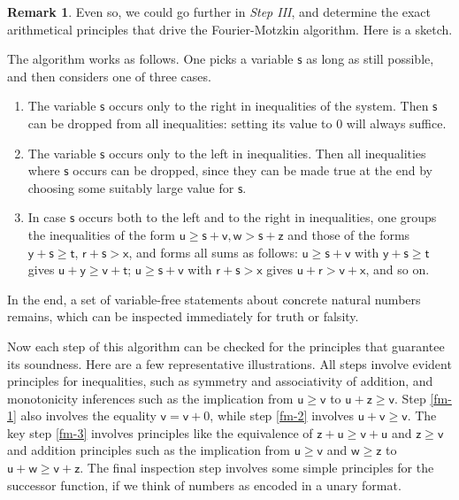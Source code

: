 \documentclass[12pt,oneside,reqno]{amsart}
\theoremstyle{definition}
\newtheorem{remark}{Remark}
\begin{document}
\begin{remark} \label{rem:fourier} Even so, we could go further in \emph{Step III}, and determine the exact arithmetical principles that drive the Fourier-Motzkin algorithm. Here is a sketch. 

The algorithm works as follows. One picks a variable $\mathsf{s}$ as long as still possible, and then considers one of three cases. \begin{enumerate}[label=(\roman*)]
\item \label{fm-1} The variable $\mathsf{s}$ occurs only to the right in inequalities of the system. Then $\mathsf{s}$ can be dropped from all inequalities: setting its value to 0 will always suffice. \item \label{fm-2} The variable $\mathsf{s}$ occurs only to the left in inequalities. Then all inequalities where $\mathsf{s}$ occurs can be dropped, since they can be made true at the end by choosing some suitably large value for $\mathsf{s}$. \item \label{fm-3} In case $\mathsf{s}$ occurs both to the left and to the right in inequalities, one groups the inequalities of the form $\mathsf{u} \geq \mathsf{s} + \mathsf{v}, \mathsf{w}> \mathsf{s} + \mathsf{z}$ and those of the forms $\mathsf{y} + \mathsf{s}\geq \mathsf{t}$, $\mathsf{r} + \mathsf{s}>\mathsf{x}$, and forms all sums as follows:
$\mathsf{u}\geq \mathsf{s} + \mathsf{v}$ with $\mathsf{y} + \mathsf{s}\geq \mathsf{t}$ gives $\mathsf{u}+\mathsf{y} \geq \mathsf{v} + \mathsf{t}$; $\mathsf{u} \geq \mathsf{s} + \mathsf{v}$ with $\mathsf{r} + \mathsf{s} > \mathsf{x}$ gives $\mathsf{u}+\mathsf{r} > \mathsf{v} + \mathsf{x}$, and so on. \end{enumerate}
In the end, a set of variable-free statements about concrete natural numbers remains, which can be inspected immediately for truth or falsity.


Now each step of this algorithm can be checked for the principles that guarantee its soundness. Here are a few representative illustrations. All steps involve evident  principles for inequalities, such as symmetry and associativity of addition, and  monotonicity inferences such as the implication from $\mathsf{u} \geq \mathsf{v}$ to $\mathsf{u} + \mathsf{z} \geq \mathsf{v}$. Step \ref{fm-1} also involves the equality $\mathsf{v} = \mathsf{v} + 0$, while step \ref{fm-2} involves $\mathsf{u} + \mathsf{v} \geq \mathsf{v}$. The key step \ref{fm-3}  involves principles like the equivalence of $\mathsf{z} + \mathsf{u} \geq \mathsf{v} + \mathsf{u}$ and $\mathsf{z} \geq \mathsf{v}$ and  addition principles such as the implication from $\mathsf{u} \geq \mathsf{v}$ and $\mathsf{w} \geq \mathsf{z}$ to $\mathsf{u}+\mathsf{w} \geq \mathsf{v} + \mathsf{z}$. The final inspection step involves some simple principles for the successor function, if we think of numbers as encoded in a unary format.
\end{remark}
\end{document}
